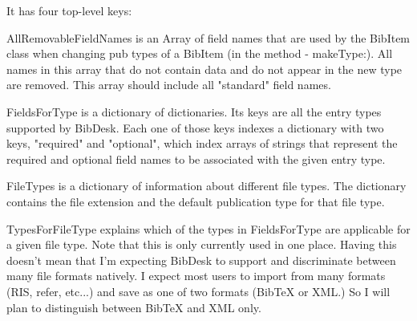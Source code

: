 \documentclass[11pt]{book}
\begin{document}
It has four top-level keys:

AllRemovableFieldNames is an Array of field names that are used by the BibItem class when changing pub types of a BibItem (in the method - makeType:). All names in this array that do not contain data and do not appear in the new type are removed. This array should include all "standard" field names.

FieldsForType is a dictionary of dictionaries. Its keys are all the entry types supported by BibDesk. Each one of those keys indexes a dictionary with two keys, "required" and "optional", which index arrays of strings that represent the required and optional field names to be associated with the given entry type.

FileTypes is a dictionary of information about different file types. The dictionary contains the file extension and the default publication type for that file type. 

TypesForFileType explains which of the types in FieldsForType are applicable for a given file type. Note that this is only currently used in one place. Having this doesn't mean that I'm expecting BibDesk to support and discriminate between many file formats natively. I expect most users to import from many formats (RIS, refer, etc...) and save as one of two formats (BibTeX or XML.) So I will plan to distinguish between BibTeX and XML only.

 
\end{document}
